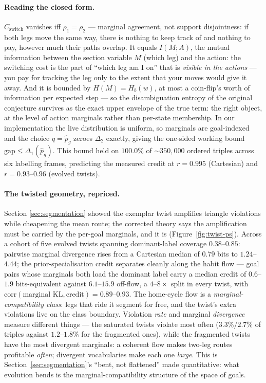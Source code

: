 \documentclass[a4paper, notitlepage, 11pt]{article}
\theoremstyle{plain}
\begin{document}
\paragraph{Reading the closed form.}  $C_{\mathrm{switch}}$ vanishes iff
$\rho_1 = \rho_2$ --- marginal agreement, not support disjointness: if
both legs move the same way, there is nothing to keep track of and
nothing to pay, however much their paths overlap.  It equals
$I(M; A)$, the mutual information between the section variable
$M$ (which leg) and the action: the switching cost is the part of
``which leg am I on'' that is \emph{visible in the actions} --- you pay
for tracking the leg only to the extent that your moves would give it
away.  And it is bounded by $H(M) = H_b(w)$, at most a coin-flip's
worth of information per expected step --- so the disambiguation
entropy of the original conjecture survives as the exact upper envelope
of the true term: the right object, at the level of action marginals
rather than per-state membership.  In our implementation the live distribution is
uniform, so marginals are goal-indexed and the choice $q = \hat{p}_g$
zeroes $\Delta_2$ exactly, giving the one-sided working bound
$\mathrm{gap} \leq \Delta_1(\hat{p}_g)$.  This bound held on
$100.0\%$ of $\sim\!350{,}000$ ordered triples across six labelling
frames, predicting the measured credit at $r = 0.995$ (Cartesian) and
$r = 0.93$--$0.96$ (evolved twists).

\paragraph{The twisted geometry, repriced.}  Section
\ref{sec:segmentation} showed the exemplar twist amplifies triangle
violations while cheapening the mean route; the corrected theory says
the amplification must be carried by the per-goal marginals, and it is
(Figure~\ref{fig:twist-ps}).  Across a cohort of five evolved twists
spanning dominant-label coverage $0.38$--$0.85$: pairwise marginal
divergence rises from a Cartesian median of $0.79$ bits to
$1.24$--$4.44$; the prior-specialisation credit separates cleanly along
the habit flow --- goal pairs whose marginals both load the dominant
label carry a median credit of $0.6$--$1.9$ bits-equivalent against
$6.1$--$15.9$ off-flow, a $4$--$8\times$ split in every twist, with
$\mathrm{corr}(\text{marginal KL}, \text{credit}) = 0.89$--$0.93$.  The
home-cycle flow is a \emph{marginal-compatibility class}: legs that
ride it segment for free, and the twist's extra violations live on the
class boundary.  Violation \emph{rate} and marginal \emph{divergence}
measure different things --- the saturated twists violate most often
($3.3\%$/$2.7\%$ of triples against $1.2$--$1.8\%$ for the fragmented
ones), while the fragmented twists have the most divergent marginals: a
coherent flow makes two-leg routes profitable \emph{often}; divergent
vocabularies make each one \emph{large}.  This is
Section~\ref{sec:segmentation}'s ``bent, not flattened'' made
quantitative: what evolution bends is the marginal-compatibility
structure of the space of goals.
\end{document}
